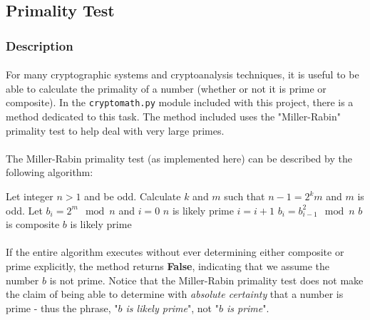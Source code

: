 \documentclass[12pt,a4paper]{article}
\begin{document}

\subsection{Primality Test}
\subsubsection{Description}
\paragraph{}
For many cryptographic systems and cryptoanalysis techniques, it is useful to 
be able to calculate the primality of a number (whether or not it is prime or 
composite).  In the \verb|cryptomath.py| module included with this project, 
there is a method dedicated to this task.  The method included uses the 
"Miller-Rabin" primality test to help deal with very large primes.

\paragraph{}
The Miller-Rabin primality test (as implemented here) can be described by the 
following algorithm:

\begin{algorithm}
	\begin{algorithmic}
    \State Let integer $n > 1$ and be odd.
    \State Calculate $k$ and $m$ such that $n - 1 = 2^{k}m$ and $m$ is odd.
    \State Let $b_{i} = 2^{m} \mod{n}$ and $i = 0$
      \State $n$ is likely prime
    \EndIf
      \State $i = i + 1$
      \State $b_{i} = b_{i-1}^{2} \mod{n}$
        \State $b$ is composite
        \State $b$ is likely prime
      \EndIf
    \EndFor
	\end{algorithmic} 
\end{algorithm}

\paragraph{}
If the entire algorithm executes without ever determining either composite or 
prime explicitly, the method returns \textbf{False}, indicating that we assume 
the number $b$ is not prime.  Notice that the Miller-Rabin primality test does 
not make the claim of being able to determine with \textit{absolute certainty} 
that a number is prime - thus the phrase, "\textit{$b$ is likely prime}", not 
"\textit{$b$ is prime}".
\end{document}
